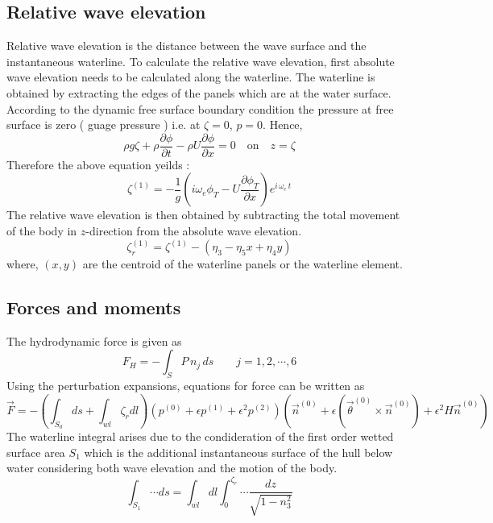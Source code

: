 \subsection{Relative wave elevation}
Relative wave elevation is the distance between the wave surface and the instantaneous waterline. To calculate the
relative wave elevation, first absolute wave elevation needs to be calculated along the waterline. The waterline is obtained 
by extracting the edges of the panels which are at the water surface. According to the dynamic free surface boundary 
condition the pressure at free surface is zero ( guage pressure ) i.e. at $\zeta=0$, $p=0$. Hence, 
\begin{equation}
    \rho g \zeta + \rho\frac{\partial \phi}{\partial t} - \rho U \frac{\partial \phi}{\partial x} =0 \quad \text{on} \quad z=\zeta 
\end{equation}
Therefore the above equation yeilds :
\begin{equation}
    \zeta^{(1)} = -\frac{1}{g}\left(i\omega_e \phi_T - U\frac{\partial \phi_T}{\partial x}\right) e^{i\,\omega_e\,t}
\end{equation}
The relative wave elevation is  then obtained by subtracting the total movement of the body in $z$-direction from the
absolute wave elevation.
\begin{equation}
    \zeta^{(1)}_r =\zeta^{(1)} - (\eta_3 - \eta_5x + \eta_4y)
\end{equation}
where, $(x, y)$ are the centroid of the waterline panels or the waterline element.


\subsection{Forces and moments}
The hydrodynamic force is given as 
\begin{equation}
    F_H = -\int_S P\,n_j\,ds \quad \quad j=1, 2,\cdots, 6
\end{equation}
Using the perturbation expansions, equations for force can be written as
\begin{equation}
    \label{eq:per_force}
    \vec{F} = -\left(\int_{S_0}ds+\int_{wl}\zeta_r dl\right)(p^{(0)} + \epsilon p^{(1)} +
    \epsilon^2 p^{(2)}) (\vec{n}^{(0)}+\epsilon(\vec{\theta}^{(0)} \times \vec{n}^{(0)})+\epsilon^2H\vec{n}^{(0)})
\end{equation} 
The waterline integral arises due to the condideration of the first order wetted surface 
area $S_1$ which is the additional instantaneous surface of the hull below water considering 
both wave elevation and the motion of the body.
\begin{equation}
    \int_{S_1}\cdots ds = \int_{wl} dl \int_{0}^{\zeta_r}\cdots \frac{dz}{\sqrt{1-n^2_3}}
\end{equation}

